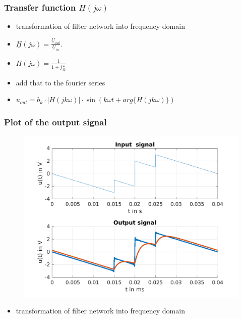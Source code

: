 \documentclass{beamer}
\begin{document}
\begin{frame}
  \frametitle{Transfer function $\underline{H}(j\omega)$}
  \begin{itemize}
    \item transformation of filter network into frequency domain
    \item $\underline{H}(j\omega) = \frac{\underline{U}_{out}}{\underline{U}_{in}}.$
    \item $\underline{H}(j\omega) = \frac{1}{1 + j\frac{\omega}{\Omega}}$
    \item add that to the fourier series
    \item $u_{out} = b_k \cdot |H(jk\omega)| \cdot \sin(k\omega t + arg\{H(jk\omega)\})$
  \end{itemize}
\end{frame}
\begin{frame}
  \frametitle{Plot of the output signal}
  \begin{figure}
    \includegraphics[scale=0.5]{../latex/Figures/output_signal.png}
  \end{figure}
  \begin{itemize}
    \item transformation of filter network into frequency domain
  \end{itemize}
\end{frame}
\end{document}
